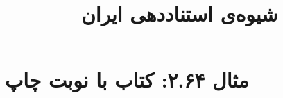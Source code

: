 \documentclass[a4paper,10pt]{article}
\begin{document}
\title{شیوه‌ی استناددهی ایران
 }
\author{}
\date{}
\maketitle



\section*{مثال ۲.۶۴: کتاب با نوبت چاپ}

\cite{مهاجر1398}






\end{document}
